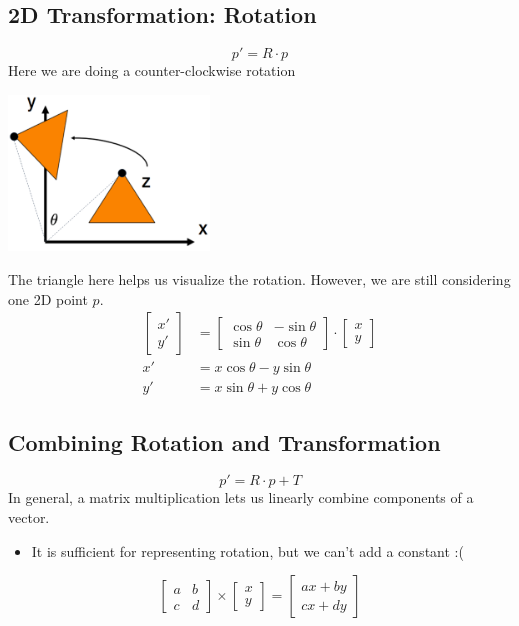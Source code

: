 \documentclass[10pt]{article}
\begin{document}
\subsection*{2D Transformation: Rotation}
\[p' = R \cdot p\]
Here we are doing a counter-clockwise rotation
\begin{center} 
	\includegraphics*[width=0.4\textwidth]{L1_3.png} 
\end{center}

The triangle here helps us visualize the rotation.  However, we are still considering one 2D point $p$.
\begin{align*}
    \begin{bmatrix} x' \\ y' \end{bmatrix} &= \begin{bmatrix} \cos \theta & -\sin \theta \\ \sin \theta & \cos \theta \end{bmatrix} \cdot \begin{bmatrix} x \\ y \end{bmatrix}\\
    x' &= x \cos \theta - y \sin \theta\\
    y' &= x \sin \theta + y \cos \theta
\end{align*}

\subsection*{Combining Rotation and Transformation}
\[p' = R \cdot p + T\]
In general, a matrix multiplication lets us linearly combine components of a vector.
\begin{itemize}
	\item It is sufficient for representing rotation, but we can't add a constant :(
\end{itemize}
\[\begin{bmatrix} a & b \\ c & d \end{bmatrix} \times \begin{bmatrix} x \\ y \end{bmatrix} = \begin{bmatrix} ax + by \\ cx + dy \end{bmatrix}\]
\end{document}
